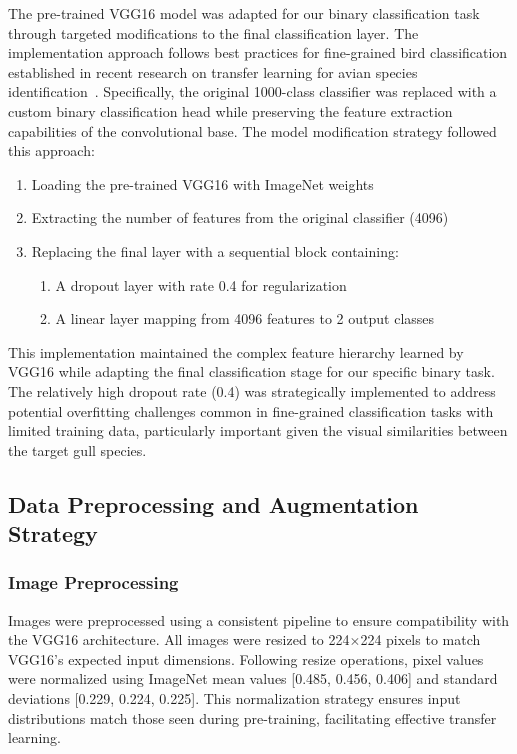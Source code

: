 The pre-trained VGG16 model was adapted for our binary classification task through targeted modifications to the final classification layer. The implementation approach follows best practices for fine-grained bird classification established in recent research on transfer learning for avian species identification~\cite{avian2023}. Specifically, the original 1000-class classifier was replaced with a custom binary classification head while preserving the feature extraction capabilities of the convolutional base. The model modification strategy followed this approach:

\begin{enumerate}
    \item Loading the pre-trained VGG16 with ImageNet weights
    \item Extracting the number of features from the original classifier (4096)
    \item Replacing the final layer with a sequential block containing:
    \begin{enumerate}
        \item A dropout layer with rate 0.4 for regularization
        \item A linear layer mapping from 4096 features to 2 output classes
    \end{enumerate}
\end{enumerate}

This implementation maintained the complex feature hierarchy learned by VGG16 while adapting the final classification stage for our specific binary task. The relatively high dropout rate (0.4) was strategically implemented to address potential overfitting challenges common in fine-grained classification tasks with limited training data, particularly important given the visual similarities between the target gull species.

\subsection{Data Preprocessing and Augmentation Strategy}

\subsubsection{Image Preprocessing}

Images were preprocessed using a consistent pipeline to ensure compatibility with the VGG16 architecture. All images were resized to 224$\times$224 pixels to match VGG16's expected input dimensions. Following resize operations, pixel values were normalized using ImageNet mean values [0.485, 0.456, 0.406] and standard deviations [0.229, 0.224, 0.225]. This normalization strategy ensures input distributions match those seen during pre-training, facilitating effective transfer learning.


